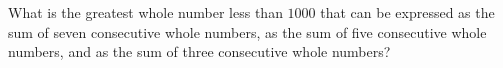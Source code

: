 What is the greatest whole number less than $1000$ that can be expressed as the sum of seven consecutive whole numbers, as the sum of five consecutive whole numbers, and as the sum of three consecutive whole numbers?

